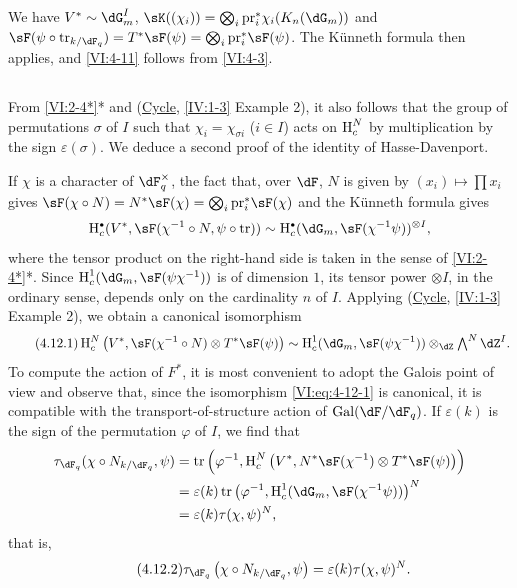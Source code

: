 We have $V^\ast\sim \dG_m^I$, 
$\sK((\chi_i)) = \bigotimes_i \pr_i^\ast \chi_i(K_n(\dG_m))$ and 
$\sF(\psi\circ \tr_{k/\dF_q})=T^\ast \sF(\psi) = \bigotimes_i \pr_i^\ast \sF(\psi)$. 
The K\"unneth formula then applies, and \ref{VI:4-11} follows from 
\ref{VI:4-3}. 





\subsection{}\label{VI:4-12}

From \ref{VI:2-4*}* and (\hyperref[IV]{Cycle}, \ref{IV:1-3} Example 2), it also follows 
that the group of permutations $\sigma$ of $I$ such that 
$\chi_i = \chi_{\sigma i}$ ($i\in I$) acts on $\operatorname{H}_c^N$ by multiplication by 
the sign $\varepsilon(\sigma)$. We deduce a second proof 
of the identity of Hasse-Davenport. 

If $\chi$ is a character of $\dF_q^\times$, the fact that, over $\dF$, $N$ 
is given by $(x_i)\mapsto \prod x_i$ gives 
$\sF(\chi\circ N)=N^\ast\sF(\chi) = \bigotimes_i \pr_i^\ast\sF(\chi)$ 
and the K\"unneth formula gives 
\[
  \h_c^\bullet(V^\ast,\sF(\chi^{-1}\circ N,\psi\circ \tr)) \sim \h_c^\bullet(\dG_m,\sF(\chi^{-1}\psi))^{\otimes I} \text{,} 
\]
where the tensor product on the right-hand side is taken in the sense of 
\ref{VI:2-4*}*. Since $\h_c^1(\dG_m,\sF(\psi\chi^{-1}))$ is of dimension 
$1$, its tensor power $\otimes I$, in the ordinary sense, depends only on 
the cardinality $n$ of $I$. Applying (\hyperref[IV]{Cycle}, \ref{IV:1-3} Example 
2), we obtain a canonical isomorphism 
\begin{equation*}\tag{4.12.1}\label{VI:eq:4-12-1}
  \h_c^N\left(V^\ast,\sF(\chi^{-1}\circ N)\otimes T^\ast \sF(\psi)\right) \sim \h_c^1(\dG_m,\sF(\psi\chi^{-1})) \otimes_\dZ \textstyle \bigwedge^N \dZ^I \text{.}
\end{equation*}
To compute the action of $F^\ast$, it is most convenient to adopt the Galois 
point of view and observe that, since the isomorphism \eqref{VI:eq:4-12-1} is 
canonical, it is compatible with the transport-of-structure action of 
$\gal(\dF/\dF_q)$. If $\varepsilon(k)$ is the sign of the permutation 
$\varphi$ of $I$, we find that 
\begin{align*} 
  \tau_{\dF_q}(\chi\circ N_{k/\dF_q},\psi) 
    &= \tr\left(\varphi^{-1},\h_c^N\left(V^\ast,N^\ast\sF(\chi^{-1})\otimes T^\ast \sF(\psi)\right)\right) \\ 
    &= \varepsilon(k) \tr\left(\varphi^{-1},\h_c^1(\dG_m,\sF(\chi^{-1}\psi))\right)^N \\
    &= \varepsilon(k) \tau(\chi,\psi)^N \text{,} 
\end{align*}
that is, 
\begin{equation*}\tag{4.12.2}\label{VI:eq:4-12-2}
  \tau_{\dF_q}\left(\chi\circ N_{k/\dF_q},\psi\right) = \varepsilon(k) \tau(\chi,\psi)^N \text{.} 
\end{equation*}

